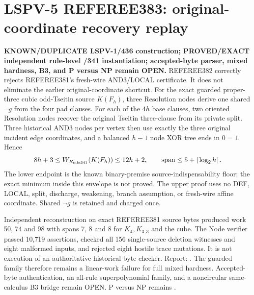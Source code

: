 \section*{LSPV-5 REFEREE383: original-coordinate recovery replay}
\textbf{KNOWN/DUPLICATE LSPV-1/436 construction; PROVED/EXACT independent
rule-level /341 instantiation; accepted-byte parser, mixed hardness, B3, and P
versus NP remain OPEN.}
REFEREE382 correctly rejects REFEREE381's fresh-wire AND3/LOCAL certificate.
It does not eliminate the earlier original-coordinate shortcut.  For the exact
guarded proper-three cubic odd-Tseitin source $K(F_h)$, three Resolution nodes
derive one shared $\neg g$ from the four pad clauses.  For each of the $4h$
base clauses, two oriented Resolution nodes recover the original Tseitin
three-clause from its private split.  Three historical AND3 nodes per vertex
then use exactly the three original incident edge coordinates, and a balanced
$h-1$ node XOR tree ends in $0=1$.  Hence
\[
 8h+3\le W_{R_{\rm mix341}}(K(F_h))\le 12h+2,
 \qquad \operatorname{span}\le5+\lceil\log_2 h\rceil.
\]
The lower endpoint is the known binary-premise source-indispensability floor;
the exact minimum inside this envelope is not proved.  The upper proof uses no
DEF, LOCAL, split, discharge, weakening, branch assumption, or fresh-wire
affine coordinate.  Shared $\neg g$ is retained and charged once.

Independent reconstruction on exact REFEREE381 source bytes produced work
50, 74 and 98 with spans 7, 8 and 8 for $K_4,K_{3,3}$ and the cube.  The Node
verifier passed 10,719 assertions, checked all 156 single-source deletion
witnesses and eight malformed inputs, and rejected eight hostile trace
mutations.  It is not execution of an authoritative historical byte checker.
Report:
.
The guarded family therefore remains a linear-work failure for full mixed
hardness.  Accepted-byte authentication, an all-rule superpolynomial family,
and a noncircular same-calculus B3 bridge remain OPEN.  P versus NP remains
\OPEN.
